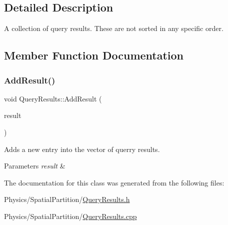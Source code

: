 \subsection{Detailed Description}
A collection of query results. These are not sorted in any specific order. 

\subsection{Member Function Documentation}
\mbox{\label{classQueryResults_ab267e6a702a708529aa39eb140f52bd3}} 
\subsubsection{\texorpdfstring{Add\+Result()}{AddResult()}}
{\footnotesize\ttfamily void Query\+Results\+::\+Add\+Result (\begin{DoxyParamCaption}\item[{const \hyperlink{classQueryResult}{Query\+Result} \&}]{result }\end{DoxyParamCaption})}



Adds a new entry into the vector of querry results. 


\begin{DoxyParams}{Parameters}
{\em result} & \\
\hline
\end{DoxyParams}


The documentation for this class was generated from the following files\+:\begin{DoxyCompactItemize}
\item 
Physics/\+Spatial\+Partition/\hyperlink{QueryResults_8h}{Query\+Results.\+h}\item 
Physics/\+Spatial\+Partition/\hyperlink{QueryResults_8cpp}{Query\+Results.\+cpp}\end{DoxyCompactItemize}
